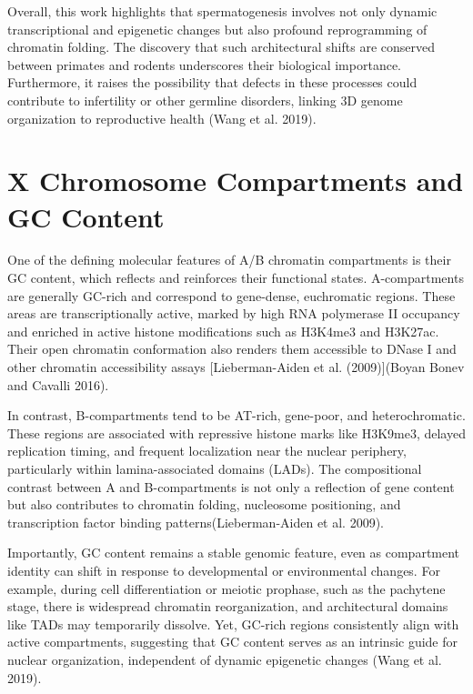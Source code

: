 \documentclass[
  a4paper,
  openany]{scrbook}
\begin{document}
Overall, this work highlights that spermatogenesis involves not only
dynamic transcriptional and epigenetic changes but also profound
reprogramming of chromatin folding. The discovery that such
architectural shifts are conserved between primates and rodents
underscores their biological importance. Furthermore, it raises the
possibility that defects in these processes could contribute to
infertility or other germline disorders, linking 3D genome organization
to reproductive health (Wang et al. 2019).

\section{X Chromosome Compartments and GC
Content}\label{x-chromosome-compartments-and-gc-content}

One of the defining molecular features of A/B chromatin compartments is
their GC content, which reflects and reinforces their functional states.
A-compartments are generally GC-rich and correspond to gene-dense,
euchromatic regions. These areas are transcriptionally active, marked by
high RNA polymerase II occupancy and enriched in active histone
modifications such as H3K4me3 and H3K27ac. Their open chromatin
conformation also renders them accessible to DNase I and other chromatin
accessibility assays {[}Lieberman-Aiden et al. (2009){]}(Boyan Bonev and
Cavalli 2016).

In contrast, B-compartments tend to be AT-rich, gene-poor, and
heterochromatic. These regions are associated with repressive histone
marks like H3K9me3, delayed replication timing, and frequent
localization near the nuclear periphery, particularly within
lamina-associated domains (LADs). The compositional contrast between A
and B-compartments is not only a reflection of gene content but also
contributes to chromatin folding, nucleosome positioning, and
transcription factor binding patterns(Lieberman-Aiden et al. 2009).

Importantly, GC content remains a stable genomic feature, even as
compartment identity can shift in response to developmental or
environmental changes. For example, during cell differentiation or
meiotic prophase, such as the pachytene stage, there is widespread
chromatin reorganization, and architectural domains like TADs may
temporarily dissolve. Yet, GC-rich regions consistently align with
active compartments, suggesting that GC content serves as an intrinsic
guide for nuclear organization, independent of dynamic epigenetic
changes (Wang et al. 2019).
\end{document}
